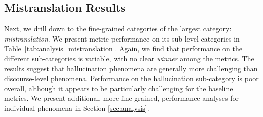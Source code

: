 \documentclass[11pt]{article}
\begin{document}
\subsection{Mistranslation Results}
Next, we drill down to the fine-grained categories of the largest category: \textit{mistranslation}. We present metric performance on its sub-level categories in Table~\ref{tab:analysis_mistranslation}. Again, we find that performance on the different sub-categories is variable, with no clear \textit{winner} among the metrics. The results suggest that \hyperref[sec:hallucination]{hallucination} phenomena are generally more challenging than \hyperref[sec:discourse]{discourse-level} phenomena. Performance on the \hyperref[sec:hallucination]{hallucination} sub-category is poor overall, although it appears to be particularly challenging for the baseline metrics. We present additional, more fine-grained, performance analyses for individual phenomena in Section \ref{sec:analysis}. 
\end{document}
